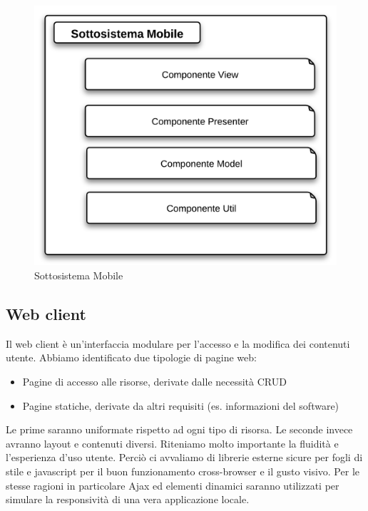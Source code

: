 {{%
\begin{figure}[H]
\centering
\includegraphics[scale=0.7]{images/cap2/Mobile/sottosistemaMobile.png} %
\caption{Sottosistema Mobile}
\end{figure}


\subsection{Web client}
Il web client è un'interfaccia modulare per l'accesso e la modifica dei contenuti utente. Abbiamo identificato due tipologie di pagine web:

\begin{itemize}
\item Pagine di accesso alle risorse, derivate dalle necessità CRUD
\item Pagine statiche, derivate da altri requisiti (es. informazioni del software)
\end{itemize}

Le prime saranno uniformate rispetto ad ogni tipo di risorsa. Le seconde invece avranno layout e contenuti diversi. Riteniamo molto importante la fluidità e l'esperienza d'uso utente. Perciò ci avvaliamo di librerie esterne sicure per fogli di stile e javascript per il buon funzionamento cross-browser e il gusto visivo. Per le stesse ragioni in particolare Ajax ed elementi dinamici saranno utilizzati per simulare la responsività di una vera applicazione locale.

}}
